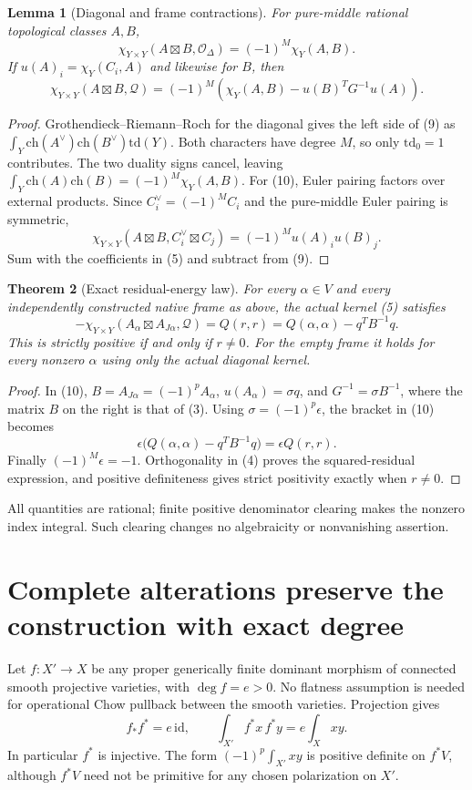 \documentclass[11pt]{article}
\newcommand{\ch}{\mathrm{ch}}
\newcommand{\td}{\mathrm{td}}
\newcommand{\id}{\mathrm{id}}
\newtheorem{theorem}{Theorem}
\newtheorem{lemma}[theorem]{Lemma}
\begin{document}
\begin{lemma}[Diagonal and frame contractions]
For pure-middle rational topological classes $A,B$,
\[
 \chi_{Y\times Y}(A\boxtimes B,\mathcal O_\Delta)
       =(-1)^M\chi_Y(A,B).                           \tag{9}
\]
If $u(A)_i=\chi_Y(C_i,A)$ and likewise for $B$, then
\[
 \chi_{Y\times Y}(A\boxtimes B,\mathscr Q)
 =(-1)^M\left(\chi_Y(A,B)
              -u(B)^TG^{-1}u(A)\right).             \tag{10}
\]
\end{lemma}
\begin{proof}
Grothendieck--Riemann--Roch for the diagonal gives the left side
of (9) as $\int_Y\ch(A^\vee)\ch(B^\vee)\td(Y)$.
Both characters have degree $M$, so only $\td_0=1$ contributes.
The two duality signs cancel, leaving
$\int_Y\ch(A)\ch(B)=(-1)^M\chi_Y(A,B)$.
For (10), Euler pairing factors over external products.
Since $C_i^\vee=(-1)^MC_i$ and the pure-middle Euler pairing
is symmetric,
\[
 \chi_{Y\times Y}(A\boxtimes B,C_i^\vee\boxtimes C_j)
       =(-1)^M u(A)_iu(B)_j.
\]
Sum with the coefficients in (5) and subtract from (9).
\end{proof}

\begin{theorem}[Exact residual-energy law]
For every $\alpha\in V$ and every independently constructed
native frame as above, the actual kernel (5) satisfies
\[
 \boxed{
 -\chi_{Y\times Y}
       (A_\alpha\boxtimes A_{J\alpha},\mathscr Q)
       =Q(r,r)
       =Q(\alpha,\alpha)-q^TB^{-1}q.}                \tag{11}
\]
This is strictly positive if and only if $r\ne0$.
For the empty frame it holds for every nonzero $\alpha$ using
only the actual diagonal kernel.
\end{theorem}
\begin{proof}
In (10), $B=A_{J\alpha}=(-1)^p A_\alpha$,
$u(A_\alpha)=\sigma q$, and $G^{-1}=\sigma B^{-1}$,
where the matrix $B$ on the right is that of (3).
Using $\sigma=(-1)^p\epsilon$, the bracket in (10) becomes
\[
 \epsilon\bigl(Q(\alpha,\alpha)-q^TB^{-1}q\bigr)
       =\epsilon Q(r,r).
\]
Finally $(-1)^M\epsilon=-1$. Orthogonality in (4)
proves the squared-residual expression, and positive
definiteness gives strict positivity exactly when $r\ne0$.
\end{proof}
All quantities are rational; finite positive denominator clearing
makes the nonzero index integral. Such clearing changes no
algebraicity or nonvanishing assertion.

\section{Complete alterations preserve the construction with exact degree}
Let $f:X'\to X$ be any proper generically finite dominant morphism
of connected smooth projective varieties, with $\deg f=e>0$.
No flatness assumption is needed for operational Chow pullback
between the smooth varieties. Projection gives
\[
 f_*f^*=e\,\id,\qquad
 \int_{X'}f^*x\,f^*y=e\int_Xxy.                      \tag{12}
\]
In particular $f^*$ is injective. The form $(-1)^p\int_{X'}xy$
is positive definite on $f^*V$, although $f^*V$ need not be
primitive for any chosen polarization on $X'$.
\end{document}

